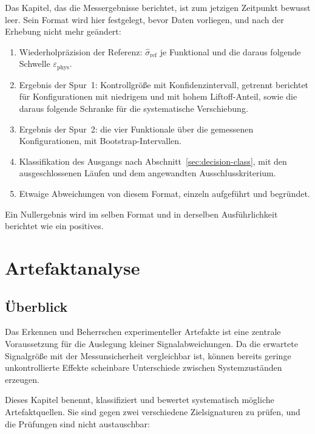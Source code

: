 \documentclass[12pt,a4paper]{report}
\begin{document}
Das Kapitel, das die Messergebnisse berichtet, ist zum jetzigen Zeitpunkt
bewusst leer. Sein Format wird hier festgelegt, bevor Daten vorliegen,
und nach der Erhebung nicht mehr geändert:

\begin{enumerate}
  \item Wiederholpräzision der Referenz:
        $\hat{\sigma}_{\mathrm{ref}}$ je Funktional und die daraus
        folgende Schwelle $\varepsilon_{\mathrm{phys}}$.
  \item Ergebnis der Spur~1: Kontrollgröße mit Konfidenzintervall,
        getrennt berichtet für Konfigurationen mit niedrigem und mit
        hohem Liftoff-Anteil, sowie die daraus folgende Schranke für die
        systematische Verschiebung.
  \item Ergebnis der Spur~2: die vier Funktionale über die gemessenen
        Konfigurationen, mit Bootstrap-Intervallen.
  \item Klassifikation des Ausgangs nach
        Abschnitt~\ref{sec:decision-class}, mit den ausgeschlossenen
        Läufen und dem angewandten Ausschlusskriterium.
  \item Etwaige Abweichungen von diesem Format, einzeln aufgeführt und
        begründet.
\end{enumerate}

Ein Nullergebnis wird im selben Format und in derselben Ausführlichkeit
berichtet wie ein positives.


\chapter{Artefaktanalyse}
\label{chap:artefakt}

\section{Überblick}

Das Erkennen und Beherrschen experimenteller Artefakte ist eine zentrale
Voraussetzung für die Auslegung kleiner Signalabweichungen. Da die
erwartete Signalgröße mit der Messunsicherheit vergleichbar ist, können
bereits geringe unkontrollierte Effekte scheinbare Unterschiede zwischen
Systemzuständen erzeugen.

Dieses Kapitel benennt, klassifiziert und bewertet systematisch mögliche
Artefaktquellen. Sie sind gegen zwei verschiedene Zielsignaturen zu
prüfen, und die Prüfungen sind nicht austauschbar:
\end{document}
